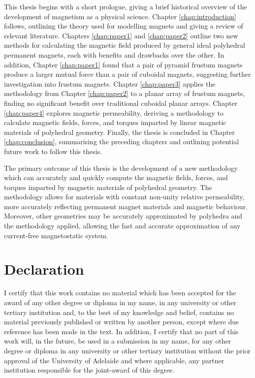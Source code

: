 This thesis begins with a short prologue, giving a brief historical overview of the development of magnetism as a physical science. Chapter \ref{chap:introduction} follows, outlining the theory used for modelling magnets and giving a review of relevant literature.  Chapters \ref{chap:paper1} and \ref{chap:paper2} outline two new methods for calculating the magnetic field produced by general ideal polyhedral permanent magnets, each with benefits and drawbacks over the other. In addition, Chapter \ref{chap:paper1} found that a pair of pyramid frustum magnets produce a larger mutual force than a pair of cuboidal magnets, suggesting further investigation into frustum magnets. Chapter \ref{chap:paper3} applies the methodology from Chapter \ref{chap:paper2} to a planar array of frustum magnets, finding no significant benefit over traditional cuboidal planar arrays. Chapter \ref{chap:paper4} explores magnetic permeability, deriving a methodology to calculate magnetic fields, forces, and torques imparted by linear magnetic materials of polyhedral geometry. Finally, the thesis is concluded in Chapter \ref{chap:conclusion}, summarising the preceding chapters and outlining potential future work to follow this thesis.

The primary outcome of this thesis is the development of a new methodology which can accurately and quickly compute the magnetic fields, forces, and torques imparted by magnetic materials of polyhedral geometry. The methodology allows for materials with constant non-unity relative permeability, more accurately reflecting permanent magnet materials and magnetic behaviour. Moreover, other geometries may be accurately approximated by polyhedra and the methodology applied, allowing the fast and accurate approximation of any current-free magnetostatic system.

\newpage
\chapter*{Declaration}
I certify that this work contains no material which has been accepted for the award of any other degree or diploma in my name, in any university or other tertiary institution and, to the best of my knowledge and belief, contains no material previously published or written by another person, except where due reference has been made in the text. In addition, I certify that no part of this work will, in the future, be used in a submission in my name, for any other degree or diploma in any university or other tertiary institution without the prior approval of the University of Adelaide and where applicable, any partner institution responsible for the joint-award of this degree.

